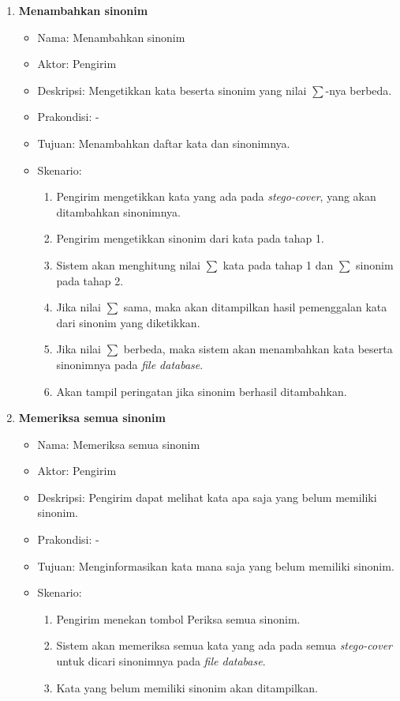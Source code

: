 \begin{enumerate}
	\item \textbf{Menambahkan sinonim}
	\begin{itemize}
		\item Nama: Menambahkan sinonim
		\item Aktor: Pengirim
		\item Deskripsi: Mengetikkan kata beserta sinonim yang nilai $\sum$-nya berbeda.
		\item Prakondisi: -
		\item Tujuan: Menambahkan daftar kata dan sinonimnya.
		\item Skenario:
			\begin{enumerate}
				\item Pengirim mengetikkan kata yang ada pada \textit{stego-cover}, yang akan ditambahkan sinonimnya.
				\item Pengirim mengetikkan sinonim dari kata pada tahap 1.
				\item Sistem akan menghitung nilai $\sum$ kata pada tahap 1 dan $\sum$ sinonim pada tahap 2.
				\item Jika nilai $\sum$ sama, maka akan ditampilkan hasil pemenggalan kata dari sinonim yang diketikkan.
				\item Jika nilai $\sum$ berbeda, maka sistem akan menambahkan kata beserta sinonimnya pada \textit{file database}.
				\item Akan tampil peringatan jika sinonim berhasil ditambahkan.
			\end{enumerate}
	\end{itemize}
	
	\item \textbf{Memeriksa semua sinonim}
	\begin{itemize}
		\item Nama: Memeriksa semua sinonim
		\item Aktor: Pengirim
		\item Deskripsi: Pengirim dapat melihat kata apa saja yang belum memiliki sinonim.
		\item Prakondisi: -
		\item Tujuan: Menginformasikan kata mana saja yang belum memiliki sinonim.
		\item Skenario:
			\begin{enumerate}
				\item Pengirim menekan tombol Periksa semua sinonim.
				\item Sistem akan memeriksa semua kata yang ada pada semua \textit{stego-cover} untuk dicari sinonimnya pada \textit{file database}.
				\item Kata yang belum memiliki sinonim akan ditampilkan.
			\end{enumerate}
	\end{itemize}
	

\end{enumerate}
